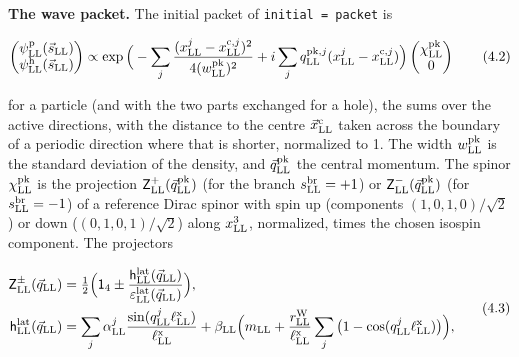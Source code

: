 \documentclass[
  10pt,
]{article}
\begin{document}
\textbf{The wave packet.} The initial packet of
\texttt{initial\ =\ packet} is

\[\begin{pmatrix}\psi^{\rm p}_{\rm LL}(\vec s_{\rm LL})\\\psi^{\rm h}_{\rm LL}(\vec s_{\rm LL})\end{pmatrix}\propto\exp\Big(-\sum_j\frac{(x^j_{\rm LL}-x^{{\rm c},j}_{\rm LL})^2}{4(w^{\rm pk}_{\rm LL})^2}+i\sum_jq^{{\rm pk},j}_{\rm LL}(x^j_{\rm LL}-x^{{\rm c},j}_{\rm LL})\Big)\begin{pmatrix}\chi^{\rm pk}_{\rm LL}\\0\end{pmatrix}\tag{4.2}\]

for a particle (and with the two parts exchanged for a hole), the sums
over the active directions, with the distance to the centre
\(\vec x^{\rm c}_{\rm LL}\) taken across the boundary of a periodic
direction where that is shorter, normalized to 1. The width
\(w^{\rm pk}_{\rm LL}\) is the standard deviation of the density, and
\(\vec q^{\rm pk}_{\rm LL}\) the central momentum. The spinor
\(\chi^{\rm pk}_{\rm LL}\) is the projection
\(\mathsf Z^+_{\rm LL}(\vec q^{\rm pk}_{\rm LL})\) (for the branch
\(s^{\rm br}_{\rm LL}=+1\)) or
\(\mathsf Z^-_{\rm LL}(\vec q^{\rm pk}_{\rm LL})\) (for
\(s^{\rm br}_{\rm LL}=-1\)) of a reference Dirac spinor with spin up
(components \((1,0,1,0)/\sqrt2\)) or down (\((0,1,0,1)/\sqrt2\)) along
\(x^3_{\rm LL}\), normalized, times the chosen isospin component. The
projectors

\[\begin{aligned}\mathsf Z^\pm_{\rm LL}(\vec q_{\rm LL})&=\tfrac12\Big(\mathsf 1_4\pm\frac{\mathsf h^{\rm lat}_{\rm LL}(\vec q_{\rm LL})}{\varepsilon^{\rm lat}_{\rm LL}(\vec q_{\rm LL})}\Big),\\\mathsf h^{\rm lat}_{\rm LL}(\vec q_{\rm LL})&=\sum_j\alpha^j_{\rm LL}\frac{\sin(q^j_{\rm LL}\ell^{\rm x}_{\rm LL})}{\ell^{\rm x}_{\rm LL}}+\beta_{\rm LL}\Big(m_{\rm LL}+\frac{r^{\rm W}_{\rm LL}}{\ell^{\rm x}_{\rm LL}}\sum_j\big(1-\cos(q^j_{\rm LL}\ell^{\rm x}_{\rm LL})\big)\Big),\end{aligned}\tag{4.3}\]
\end{document}
